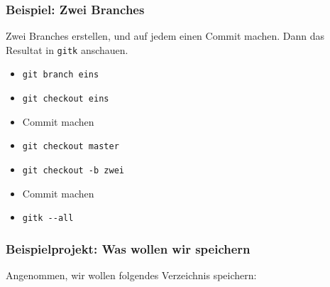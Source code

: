 \documentclass{beamer}
\begin{document}
\begin{frame}
 \frametitle{Beispiel: Zwei Branches}
  


Zwei Branches erstellen, und auf jedem einen Commit machen. Dann das
Resultat in \texttt{gitk} anschauen.

\begin{itemize}
  \item \texttt{git branch eins}
  \item \texttt{git checkout eins}
  \item Commit machen
  \item \texttt{git checkout master}
  \item \texttt{git checkout -b zwei}
  \item Commit machen
  \item \texttt{gitk -{}-all}
\end{itemize}

  
 \end{frame}
\begin{frame}
 \frametitle{Beispielprojekt: Was wollen wir speichern}
  


Angenommen, wir wollen folgendes Verzeichnis speichern:


\vspace{0.5cm}



  
 \end{frame}
\end{document}
